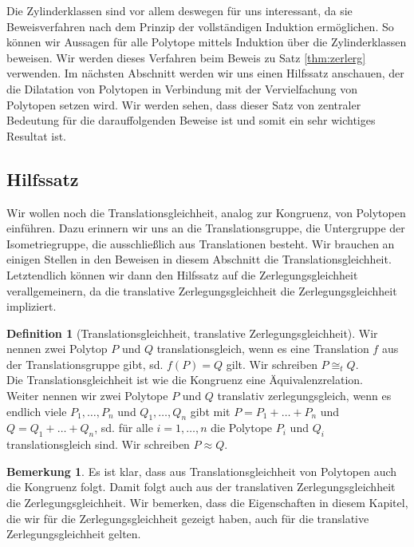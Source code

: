 \documentclass[11pt,titlepage]{article}
\theoremstyle{definition}
\newtheorem{definition}[theorem]{Definition}
\newtheorem{remark}[theorem]{Bemerkung}
\theoremstyle{remark}
\begin{document}
	Die Zylinderklassen sind vor allem deswegen für uns interessant, da sie 
	Beweisverfahren nach dem Prinzip der vollständigen Induktion ermöglichen. 
	So können wir Aussagen für alle Polytope mittels Induktion über die 
	Zylinderklassen beweisen. Wir werden dieses Verfahren beim Beweis zu Satz 
	\ref{thm:zerlerg} verwenden. Im nächsten Abschnitt werden wir uns 
	einen Hilfssatz anschauen, der die Dilatation von Polytopen 
	in Verbindung mit der Vervielfachung von Polytopen setzen wird. 
	Wir werden sehen, dass dieser Satz von zentraler Bedeutung für 
	die darauffolgenden Beweise ist und somit ein sehr wichtiges Resultat ist. 
	
	\subsection{Hilfssatz}
	
	Wir wollen noch die Translationsgleichheit, analog zur Kongruenz, 
	von Polytopen einführen. 
	Dazu erinnern wir uns an die Translationsgruppe, die 
	Untergruppe der Isometriegruppe, die ausschließlich aus Translationen besteht. 
	Wir brauchen an einigen Stellen in den Beweisen in diesem Abschnitt 
	die Translationsgleichheit. Letztendlich können wir dann den Hilfssatz 
	auf die Zerlegungsgleichheit verallgemeinern, da die translative 
	Zerlegungsgleichheit die Zerlegungsgleichheit impliziert.
	
	\begin{definition}[Translationsgleichheit, translative Zerlegungsgleichheit]
		Wir nennen zwei Polytop $P$ und $Q$ translationsgleich, wenn es 
		eine Translation $f$ aus der Translationsgruppe gibt, sd. 
		$f(P)=Q$ gilt. Wir schreiben $P\cong_t Q$. \\
		Die Translationsgleichheit ist wie die Kongruenz eine 
		Äquivalenzrelation. \\
		Weiter nennen wir zwei Polytope $P$ und $Q$ translativ 
		zerlegungsgleich, wenn es endlich viele $P_1,\ldots,P_n$ und 
		$Q_1,\ldots,Q_n$ gibt mit $P=P_1+\ldots+P_n$ und $Q=Q_1+\ldots+Q_n$, sd. 
		für alle $i=1,\ldots,n$ die Polytope $P_i$ und $Q_i$ translationsgleich 
		sind. Wir schreiben $P\approx Q$.
	\end{definition}
	
	\begin{remark}
		Es ist klar, dass aus Translationsgleichheit von Polytopen auch die 
		Kongruenz folgt. Damit folgt auch aus der translativen Zerlegungsgleichheit 
		die Zerlegungsgleichheit. Wir bemerken, dass die Eigenschaften 
		in diesem Kapitel, 
		die wir für die Zerlegungsgleichheit gezeigt haben, 
		auch für die translative Zerlegungsgleichheit gelten. 
	\end{remark}
	
\end{document}
